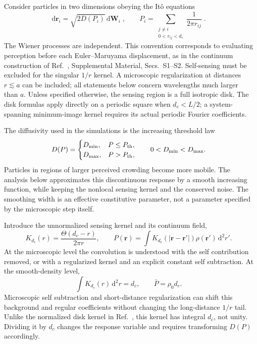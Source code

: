 \documentclass{article}
\begin{document}
Consider particles in two dimensions obeying the It\^{o} equations
\begin{equation}
    \mathrm d\mathbf r_i=\sqrt{2D(P_i)}\,\mathrm d\mathbf W_i \;,
    \qquad
    P_i=\sum_{\substack{j\ne i\\0<r_{ij}<d_c}}\frac{1}{2\pi r_{ij}}\;.
    \label{eq:ffParticle}
\end{equation}
The Wiener processes are independent. This convention corresponds to evaluating perception before each Euler--Maruyama displacement, as in the continuum construction of Ref.~\cite{Wu2026NonlocalSensing}, Supplemental Material, Secs.~S1--S2. Self-sensing must be excluded for the singular $1/r$ kernel. A microscopic regularization at distances $r\lesssim a$ can be included; all statements below concern wavelengths much larger than $a$. Unless specified otherwise, the sensing region is a full isotropic disk. The disk formulas apply directly on a periodic square when $d_c<L/2$; a system-spanning minimum-image kernel requires its actual periodic Fourier coefficients.

The diffusivity used in the simulations is the increasing threshold law
\begin{equation}
    D(P)=\begin{cases}
        D_{\min},&P\leq P_{\rm th},\\
        D_{\max},&P>P_{\rm th},
    \end{cases}
    \qquad 0<D_{\min}<D_{\max}.
    \label{eq:ffStepLaw}
\end{equation}
Particles in regions of larger perceived crowding become more mobile. The analysis below approximates this discontinuous response by a smooth increasing function, while keeping the nonlocal sensing kernel and the conserved noise. The smoothing width is an effective constitutive parameter, not a parameter specified by the microscopic step itself.

Introduce the unnormalized sensing kernel and its continuum field,
\begin{equation}
    K_{d_c}(r)=\frac{\Theta(d_c-r)}{2\pi r},\qquad
    P(\mathbf r)=\int K_{d_c}(|\mathbf r-\mathbf r'|)\rho(\mathbf r')\,\mathrm d^2r'.
    \label{eq:ffKernel}
\end{equation}
At the microscopic level the convolution is understood with the self contribution removed, or with a regularized kernel and an explicit constant self subtraction. At the smooth-density level,
\begin{equation}
    \int K_{d_c}(r)\,\mathrm d^2r=d_c,\qquad \bar P=\rho_0d_c.
    \label{eq:ffBackground}
\end{equation}
Microscopic self subtraction and short-distance regularization can shift this background and regular coefficients without changing the long-distance $1/r$ tail. Unlike the normalized disk kernel in Ref.~\cite{Wu2026NonlocalSensing}, this kernel has integral $d_c$, not unity. Dividing it by $d_c$ changes the response variable and requires transforming $D(P)$ accordingly.
\end{document}
